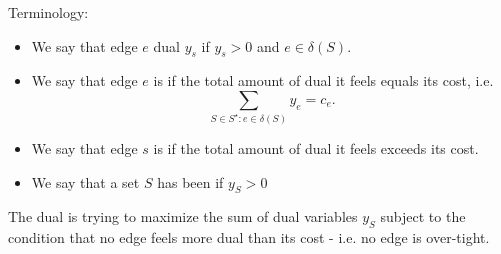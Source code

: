 \documentclass[../main/main.tex]{subfiles}
\begin{document}
\begin{remark}
	Terminology:
	\begin{itemize}
		\item We say that edge $e$  dual $y_s$ if $y_s>0$ and $e\in  \delta(S)$.
		\item We say that edge $e $ is  if the total amount of dual it feels equals its cost, i.e. \[
				\sum\limits_{S\in S^\star:e\in \delta(S)} y_e=c_e
		.\] 
	\item We say that edge $s$ is  if the total amount of dual it feels exceeds its cost.
	\item We say that a set $S$ has been  if $y_S>0$
		
	\end{itemize}
\end{remark}
\begin{theorem}
	The dual is trying to maximize the sum of dual variables $y_S$ subject to the condition that no edge feels more dual than its cost - i.e. no edge is over-tight.
\end{theorem}
\end{document}

